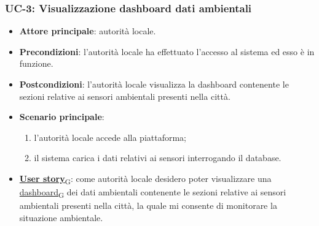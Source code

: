 \subsubsection{UC-3: Visualizzazione dashboard dati ambientali}
\begin{itemize}
	\item \textbf{Attore principale}: autorità locale.
	\item \textbf{Precondizioni}: l'autorità locale ha effettuato l'accesso al sistema ed esso è in funzione.
	\item \textbf{Postcondizioni}: l'autorità locale visualizza la dashboard contenente le sezioni relative ai sensori ambientali presenti nella città.
	\item \textbf{Scenario principale}:
	      \begin{enumerate}
		      \item l'autorità locale accede alla piattaforma;
		      \item il sistema carica i dati relativi ai sensori interrogando il database.
	      \end{enumerate}
	\item \href{https://7last.github.io/docs/pb/documentazione-interna/glossario\#user-story}{\textbf{User story}\textsubscript{G}}: come autorità locale desidero poter visualizzare una \href{https://7last.github.io/docs/pb/documentazione-interna/glossario\#dashboard}{dashboard\textsubscript{G}} dei dati ambientali contenente le sezioni relative ai sensori ambientali presenti nella città, la quale mi consente di monitorare la situazione ambientale.
\end{itemize}
\begin{center}
\end{center}



